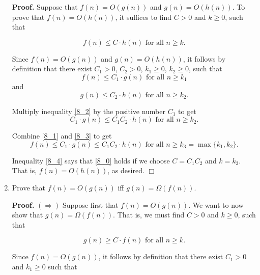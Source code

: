 \documentclass[9pt]{article}
\newcommand{\qed}{\hfill \ensuremath{\Box}}
\begin{document}
\begin{enumerate}
      \textbf{Proof.} Suppose that $f(n) = O(g(n))$ and $g(n) = O(h(n))$. To
      prove that ${f(n) = O(h(n))}$, it suffices to find $C > 0$ and $k \ge 0$,
      such that

      \begin{equation} \label{8_0}
         f(n) \le C \cdot h(n) \text{ for all } n \ge k.
      \end{equation}

      Since
      $f(n) = O(g(n))$ and $g(n) = O(h(n))$, it follows by definition that there
      exist $C_1 > 0$, $C_2 > 0$, $k_1 \ge 0$, $k_2 \ge 0$, such that
      \begin{equation} \label{8_1}
         f(n) \le C_1 \cdot g(n) \text{ for all } n \ge k_1
      \end{equation}
       and
      \begin{equation} \label{8_2}
         g(n) \le C_2 \cdot h(n) \text{ for all } n \ge k_2.
      \end{equation}

      Multiply inequality \eqref{8_2} by the positive number $C_1$ to get
      \begin{equation} \label{8_3}
         C_1 \cdot g(n) \le C_1C_2 \cdot h(n) \text{ for all } n \ge k_2.
      \end{equation}
      
      Combine \eqref{8_1} and \eqref{8_3} to get
      \begin{equation} \label{8_4}
         f(n) \le C_1 \cdot g(n) \le C_1C_2 \cdot h(n) \text{ for all }
         n \ge k_3 = \max\{k_1, k_2\}.
      \end{equation}

      Inequality \eqref{8_4} says that \eqref{8_0} holds if we choose
      $C = C_1C_2$ and $k = k_3$. That is, ${f(n) = O(h(n))}$, as desired. \qed
   \item Prove that $f(n) = O(g(n))$ iff $g(n) = \Omega(f(n))$.

      \textbf{Proof.} $(\Rightarrow)$ Suppose first that $f(n) = O(g(n))$. We
      want to now show that ${g(n) = \Omega(f(n))}$. That is, we must find
      $C > 0$ and $k \ge 0$, such that

      \begin{equation} \label{9_1}
         g(n) \ge C \cdot f(n) \text{ for all } n \ge k.
      \end{equation}

      Since $f(n) = O(g(n))$, it follows by definition that there exist
      $C_1 > 0$ and $k_1 \ge 0$ such that 


\end{enumerate}
\end{document}
